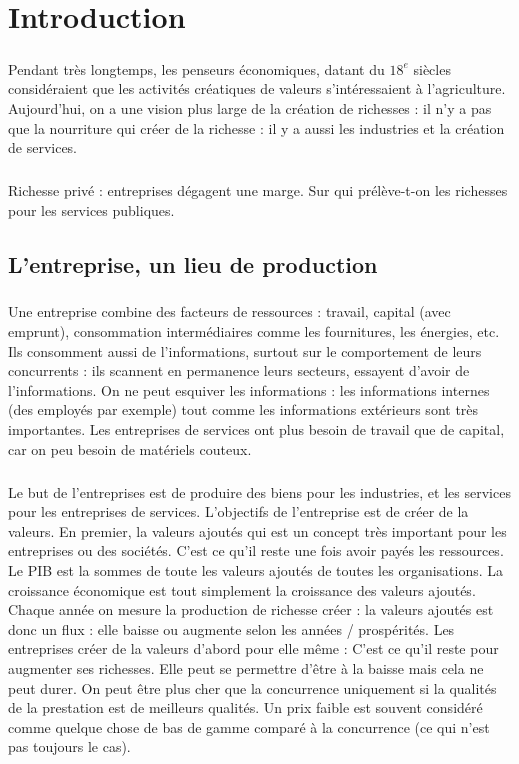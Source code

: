 \chapter{Introduction}
\paragraph{} Pendant très longtemps, les penseurs économiques, datant du $18^e$ siècles considéraient que les activités créatiques de valeurs s'intéressaient à l'agriculture. Aujourd'hui, on a une vision plus large de la création de richesses : il n'y a pas que la nourriture qui créer de la richesse : il y a aussi les industries et la création de services.
\paragraph{} Richesse privé : entreprises dégagent une marge. Sur qui prélève-t-on les richesses pour les services publiques.

\section{L'entreprise, un lieu de production}

\paragraph{} Une entreprise combine des facteurs de ressources : travail, capital (avec emprunt), consommation intermédiaires comme les fournitures, les énergies, etc. Ils consomment aussi de l'informations, surtout sur le comportement de leurs concurrents : ils scannent en permanence leurs secteurs, essayent d'avoir de l'informations. On ne peut esquiver les informations : les informations internes (des employés par exemple) tout comme les informations extérieurs sont très importantes. Les  entreprises de services ont plus besoin de travail que de capital, car on peu besoin de matériels couteux.
\paragraph{} Le but de l'entreprises est de produire des biens pour les industries, et les services pour les entreprises de services. L'objectifs de l'entreprise est de créer de la valeurs. En premier, la valeurs ajoutés qui est un concept très important pour les entreprises ou des sociétés. C'est ce qu'il reste une fois avoir payés les ressources. Le PIB est la sommes de toute les valeurs ajoutés de toutes les organisations. La croissance économique est tout simplement la croissance des valeurs ajoutés. Chaque année on mesure la production de richesse créer : la valeurs ajoutés est donc un flux : elle baisse ou augmente selon les années / prospérités. Les entreprises créer de la valeurs d'abord pour elle même : C'est ce qu'il reste pour augmenter ses richesses. Elle peut se permettre d'être à la baisse mais cela ne peut durer. On peut être plus cher que la concurrence uniquement si la qualités de la prestation est de meilleurs qualités. Un prix faible est souvent considéré comme quelque chose de bas de gamme comparé à la concurrence (ce qui n'est pas toujours le cas).
